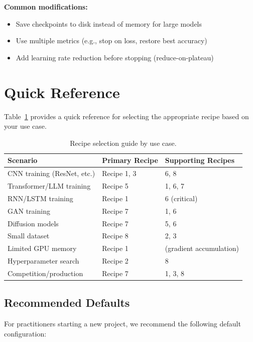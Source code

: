 \documentclass[../main.tex]{subfiles}
\begin{document}
\textbf{Common modifications:}
\begin{itemize}
    \item Save checkpoints to disk instead of memory for large models
    \item Use multiple metrics (e.g., stop on loss, restore best accuracy)
    \item Add learning rate reduction before stopping (reduce-on-plateau)
\end{itemize}

\section{Quick Reference}\label{sec:recipe-quick-reference}

Table~\ref{tab:recipe-summary} provides a quick reference for selecting the appropriate recipe based on your use case.

\begin{table}[htbp]
\centering
\caption{Recipe selection guide by use case.}
\label{tab:recipe-summary}
\begin{tabular}{@{}lll@{}}
\toprule
\textbf{Scenario} & \textbf{Primary Recipe} & \textbf{Supporting Recipes} \\
\midrule
CNN training (ResNet, etc.) & Recipe 1, 3 & 6, 8 \\
Transformer/LLM training & Recipe 5 & 1, 6, 7 \\
RNN/LSTM training & Recipe 1 & 6 (critical) \\
GAN training & Recipe 7 & 1, 6 \\
Diffusion models & Recipe 7 & 5, 6 \\
Small dataset & Recipe 8 & 2, 3 \\
Limited GPU memory & Recipe 1 & (gradient accumulation) \\
Hyperparameter search & Recipe 2 & 8 \\
Competition/production & Recipe 7 & 1, 3, 8 \\
\bottomrule
\end{tabular}
\end{table}

\subsection{Recommended Defaults}

For practitioners starting a new project, we recommend the following default configuration:
\end{document}
